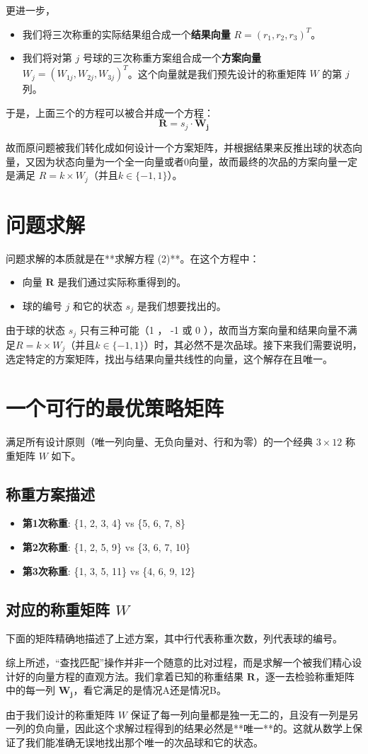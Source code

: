\documentclass[12pt, a4paper]{ctexart}
\begin{document}
更进一步，
\begin{itemize}
    \item 我们将三次称重的实际结果组合成一个\textbf{结果向量} $R = (r_1, r_2, r_3)^T$。
    \item 我们将对第 $j$ 号球的三次称重方案组合成一个\textbf{方案向量} $W_j = (W_{1j}, W_{2j}, W_{3j})^T$。这个向量就是我们预先设计的称重矩阵 $W$ 的第 $j$ 列。
\end{itemize}
于是，上面三个的方程可以被合并成一个方程：
\begin{equation}
    \mathbf{R} = s_j \cdot \mathbf{W_j}
\end{equation}

故而原问题被我们转化成如何设计一个方案矩阵，并根据结果来反推出球的状态向量，又因为状态向量为一个全一向量或者0向量，故而最终的次品的方案向量一定是满足
$R = k \times W_j$（并且$k \in \{-1, 1\}$）。
\section{问题求解}

问题求解的本质就是在**求解方程 (2)**。在这个方程中：
\begin{itemize}
    \item 向量 $\mathbf{R}$ 是我们通过实际称重得到的。
    \item 球的编号 $j$ 和它的状态 $s_j$ 是我们想要找出的。
\end{itemize}
由于球的状态 $s_j$ 只有三种可能（1 ， -1 或 0 ），故而当方案向量和结果向量不满足$R = k \times W_j$（并且$k \in \{-1, 1\}$）时，其必然不是次品球。接下来我们需要说明，选定特定的方案矩阵，找出与结果向量共线性的向量，这个解存在且唯一。



\section*{一个可行的最优策略矩阵}

满足所有设计原则（唯一列向量、无负向量对、行和为零）的一个经典 $3 \times 12$ 称重矩阵 $W$ 如下。

\subsection*{称重方案描述}
\begin{itemize}
    \item \textbf{第1次称重}: \{1, 2, 3, 4\} vs \{5, 6, 7, 8\}
    \item \textbf{第2次称重}: \{1, 2, 5, 9\} vs \{3, 6, 7, 10\}
    \item \textbf{第3次称重}: \{1, 3, 5, 11\} vs \{4, 6, 9, 12\}
\end{itemize}

\subsection*{对应的称重矩阵 $W$}
下面的矩阵精确地描述了上述方案，其中行代表称重次数，列代表球的编号。

综上所述，“查找匹配”操作并非一个随意的比对过程，而是求解一个被我们精心设计好的向量方程的直观方法。我们拿着已知的称重结果 $\mathbf{R}$，逐一去检验称重矩阵中的每一列 $\mathbf{W_j}$，看它满足的是情况A还是情况B。

由于我们设计的称重矩阵 $W$ 保证了每一列向量都是独一无二的，且没有一列是另一列的负向量，因此这个求解过程得到的结果必然是**唯一**的。这就从数学上保证了我们能准确无误地找出那个唯一的次品球和它的状态。
\end{document}
